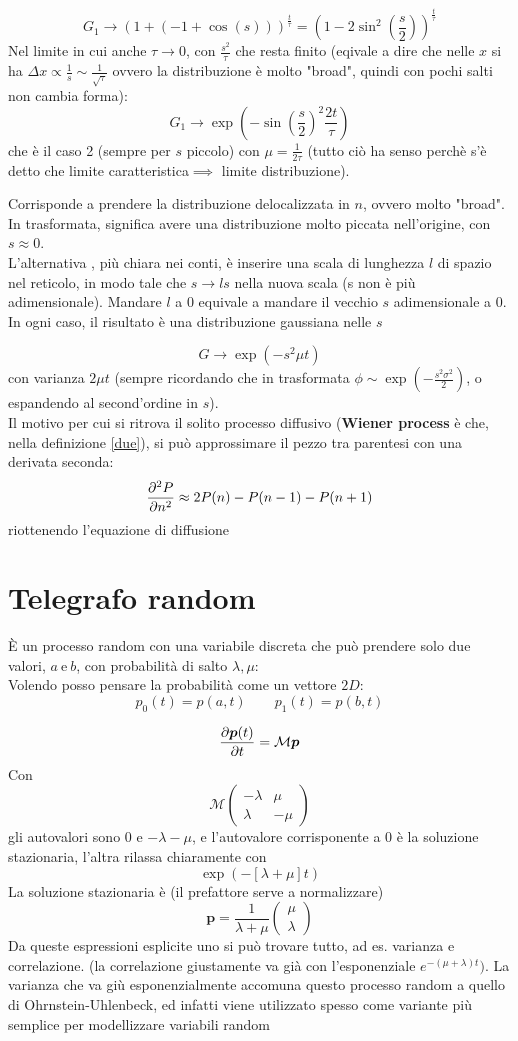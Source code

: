 \documentclass[a4paper,12pt]{article}
\theoremstyle{plain}
\renewcommand{\vec}[1]{{\boldsymbol{#1}}}
\theoremstyle{definition}
\newcommand{\Op}[1]{\mathcal{#1}}
\newcommand{\f}[2]{\frac{#1}{#2}}
\newcommand{\econg}{~\text{e}~}
\newcommand{\ra}{\rightarrow}
\theoremstyle{remark}
\begin{document}
	\[G_1\ra \left(1+(-1+\cos(s))\right)^{\f{t}{\tau}}=	\left(1-{2}{}\sin^2\left(\f{s}{2}\right)\right)^{\f{t}{\tau}}		\]
Nel limite in cui anche $\tau\ra 0$, con $\f{s^2}{\tau}$ che resta finito (eqivale a dire che nelle $x$ si ha $\Delta x\propto \f{1}{s}\sim\f{1}{\sqrt{\tau}}$ ovvero la distribuzione è molto "broad", quindi con pochi salti non cambia forma):
\[G_1\ra \exp(-\sin(\f{s}{2})^2\f{2t}{\tau})		\]	
che è il caso 2 (sempre per $s$ piccolo) con $\mu=\f{1}{2\tau}$ (tutto ciò ha senso perchè s'è detto che limite caratteristica$\implies$ limite distribuzione).
\begin{obs}
Corrisponde a prendere la distribuzione delocalizzata in $n$, ovvero molto "broad". In trasformata, significa avere una distribuzione molto piccata nell'origine, con $s\approx 0$.\\L'alternativa , più chiara nei conti, è inserire una scala di lunghezza $l$ di spazio nel reticolo, in modo tale che $s\ra ls$ nella nuova scala (s non è più adimensionale). Mandare $l$ a 0 equivale a mandare il vecchio $s$ adimensionale a 0.
\\In ogni caso, il risultato è una distribuzione gaussiana nelle $s$

\[G\ra 	\exp(-{s^2\mu t}{})		\] 
con varianza ${2\mu t}$ (sempre ricordando che in trasformata $\phi\sim\exp(-\f{s^2\sigma^2}{2})$, o espandendo al second'ordine in $s$).\\
Il motivo per cui si ritrova il solito processo diffusivo (\textbf{Wiener process} è che, nella definizione \ref{due}), si può approssimare il pezzo tra parentesi con una derivata seconda:
\[\pdv[2]{P}{n}\approx2P(n)-P(n-1)-P(n+1)\]
riottenendo l'equazione di diffusione
\end{obs}
\section{Telegrafo random}
È un processo random con una variabile discreta che può prendere solo due valori, $a\econg b$, con probabilità di salto $\lambda,\mu$:
\\Volendo posso pensare la probabilità come un vettore $2D$:
\[p_0(t)=p(a,t)\quad \quad p_1(t)=p(b,t)\]

\[\pdv{\vec{p}(t)}{t}=\Op{M}\vec{p}\]
Con \[\Op{M}\begin{pmatrix}
-\lambda&\mu\\\lambda&-\mu
\end{pmatrix}\]
gli autovalori sono $0$ e $-\lambda-\mu$, e l'autovalore corrisponente a $0$ è la soluzione stazionaria, l'altra rilassa chiaramente con \[\exp(-[\lambda+\mu]t)\]
La soluzione stazionaria è (il prefattore serve a normalizzare)\[\vec{p}=\f{1}{\lambda+\mu}\begin{pmatrix}
\mu\\\lambda\end{pmatrix}\]
Da queste espressioni esplicite uno si può trovare tutto, ad es. varianza e correlazione. (la correlazione giustamente va già con l'esponenziale $e^{-(\mu+\lambda)t})$. La varianza che va giù esponenzialmente accomuna questo processo random a quello di Ohrnstein-Uhlenbeck, ed infatti viene utilizzato spesso come variante più semplice per modellizzare variabili random
\end{document}

